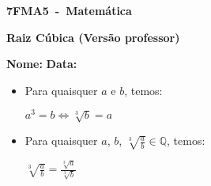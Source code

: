 \documentclass[a4paper,14pt]{article}
\begin{document}
	
	\noindent\textbf{7FMA5~-~Matemática} 
	
	\begin{center}
		\textbf{Raiz Cúbica (Versão professor)}
	\end{center}
	
	\bigskip
	
	\noindent\textbf{Nome:} \underline{\hspace{10cm}}
    \noindent\textbf{Data:} \underline{\hspace{4cm}}
	
	\bigskip
	
	\begin{multicols}{2}
	\begin{itemize}
		\item Para quaisquer $a$ e $b$, temos:
		\begin{center}
			$a^3 = b \Leftrightarrow \sqrt[3]{b} = a$
		\end{center}
	    \item Para quaisquer $a$, $b$, $\sqrt[3]{\frac{a}{b}} \in \mathbb{Q}$, temos:
	    \begin{center}
	    	$\sqrt[3]{\frac{a}{b}} = \frac{\sqrt[3]{a}}{\sqrt[3]{b}}$
	    \end{center}  
	\end{itemize}
	\begin{enumerate}
		

\end{enumerate}
\end{multicols}
\end{document}
